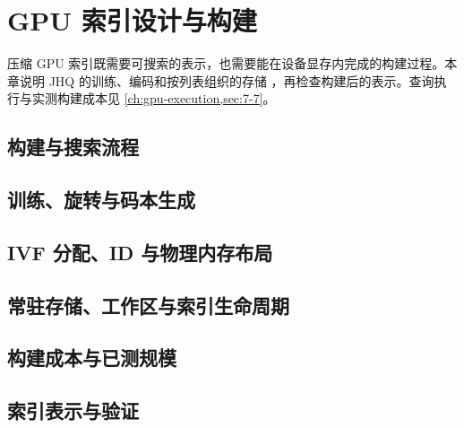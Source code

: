 \chapter{GPU 索引设计与构建}
\label{ch:architecture}
压缩 GPU 索引既需要可搜索的表示，也需要能在设备显存内完成的构建过程。本章说明 JHQ 的训练、编码和按列表组织的存储 \cite{jhq}，再检查构建后的表示。查询执行与实测构建成本见 \cref{ch:gpu-execution,sec:7-7}。

\section{构建与搜索流程}
\label{sec:4-1}


\section{训练、旋转与码本生成}
\label{sec:4-2}


\section{IVF 分配、ID 与物理内存布局}
\label{sec:4-3}


\section{常驻存储、工作区与索引生命周期}
\label{sec:4-4}


\section{构建成本与已测规模}
\label{sec:4-5}


\section{索引表示与验证}
\label{sec:4-6}

